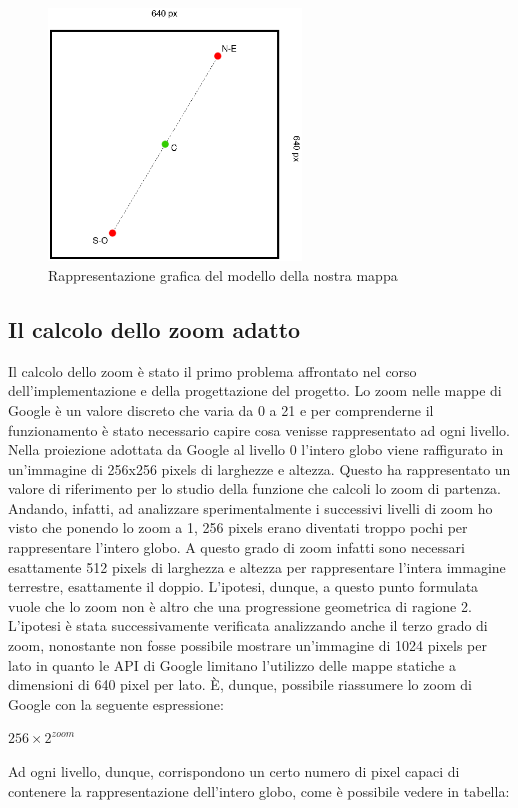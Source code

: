 \begin{figure}[H]
	\centering
	\includegraphics[width=0.6\textwidth]{figure/centromappa.eps}
	\caption{Rappresentazione grafica del modello della nostra mappa}
\end{figure}

\subsection{Il calcolo dello zoom adatto}
Il calcolo dello zoom è stato il primo problema affrontato nel corso dell'implementazione e della progettazione del progetto. Lo zoom nelle mappe di Google è un valore discreto che varia da 0 a 21 e per comprenderne il funzionamento è stato necessario capire cosa venisse rappresentato ad ogni livello. Nella proiezione adottata da Google al livello 0 l'intero globo viene raffigurato in un'immagine di 256x256 pixels di larghezze e altezza. Questo ha rappresentato un valore di riferimento per lo studio della funzione che calcoli lo zoom di partenza. Andando, infatti, ad analizzare sperimentalmente i successivi livelli di zoom ho visto che ponendo lo zoom a 1, 256 pixels erano diventati troppo pochi per rappresentare l'intero globo. A questo grado di zoom infatti sono necessari esattamente 512 pixels di larghezza e altezza per rappresentare l'intera immagine terrestre, esattamente il doppio. L'ipotesi, dunque, a questo punto formulata vuole che lo zoom non è altro che una progressione geometrica di ragione 2. L'ipotesi è stata successivamente verificata analizzando anche il terzo grado di zoom, nonostante non fosse possibile mostrare un'immagine di 1024 pixels per lato in quanto le API di Google limitano l'utilizzo delle mappe statiche a dimensioni di 640 pixel per lato. È, dunque, possibile riassumere lo zoom di Google con la seguente espressione: 
\begin{center}

	\large$256\times2^{zoom}$\par

\end{center}
Ad ogni livello, dunque, corrispondono un certo numero di pixel capaci di contenere la rappresentazione dell'intero globo, come è possibile vedere in tabella:

